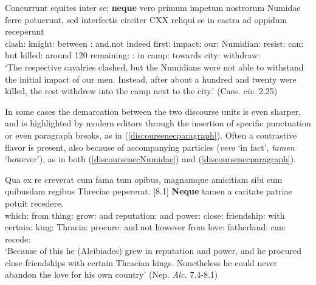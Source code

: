 \documentclass[output=paper,modfonts,nonflat,citecolor=brown,
showindex
]{langsci/langscibook}
\begin{document}
{\begin{exe}
\ex \label{discoursenecNumidae} \gll Concurrunt equites inter se; {\bf{neque}} vero primum impetum nostrorum Numidae ferre potuerunt, sed interfectis circiter CXX reliqui se in castra ad oppidum receperunt\\
clash:{} knight:{} between {}:{} and.not indeed first:{} impact:{} our:{} Numidian:{} resist:{} can:{} but killed:{} around 120 remaining:{} {}:{} in camp:{} towards city:{} withdraw:{}\\

`The respective cavalries clashed, but the Numidians were not able to withstand the initial impact of our men. Instead, after about a hundred and twenty were killed, the rest withdrew into the camp next to the city.' (Caes. {\em{civ.}} 2.25)
\end{exe}}

\noindent In some cases the demarcation between the two discourse units is even sharper, and is highlighted by modern editors through the insertion of specific punctuation or even paragraph breaks, as in (\ref{discoursenecparagraph}). Often a contrastive flavor is present, also because of accompanying particles ({\em{vero}} `in fact', {\em{tamen}} `however'), as in both (\ref{discoursenecNumidae}) and (\ref{discoursenecparagraph}).

{\begin{exe}
\ex \label{discoursenecparagraph} \gll [7.4] Qua ex re creverat cum fama tum opibus, magnamque amicitiam sibi cum quibusdam regibus Threciae pepererat. [8.1] {\bf{Neque}} tamen a caritate patriae potuit recedere.\\
\hspace{10 mm} which:{} from thing:{} grow:{} and reputation:{} and power:{} close:{} friendship:{} {} with certain:{} king:{} Thracia:{} procure:{} \hspace{10 mm} and.not however from love:{} fatherland:{} can:{} recede:{}\\

`Because of this he (Alcibiades) grew in reputation and power, and he procured close friendships with certain Thracian kings. Nonetheless he could never abandon the love for his own country'
(Nep. {\em{Alc.}} 7.4-8.1)
\end{exe}}
\end{document}
